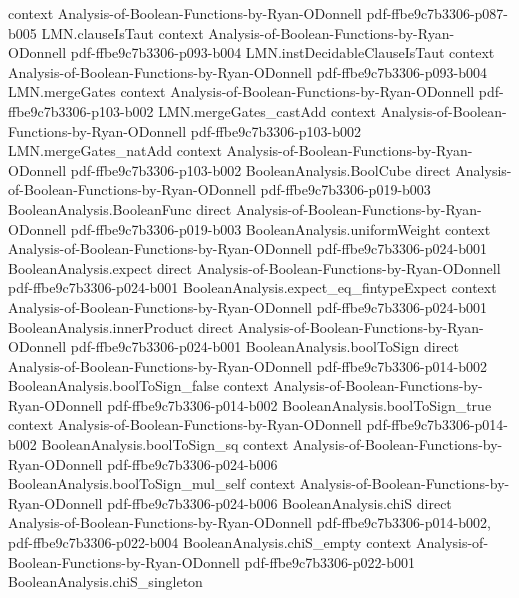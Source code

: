 \begin{theorem}
  {context}
  {Analysis-of-Boolean-Functions-by-Ryan-ODonnell}
  {pdf-ffbe9c7b3306-p087-b005}
\proofstep
  {LMN.clauseIsTaut}
  {context}
  {Analysis-of-Boolean-Functions-by-Ryan-ODonnell}
  {pdf-ffbe9c7b3306-p093-b004}
\proofstep
  {LMN.instDecidableClauseIsTaut}
  {context}
  {Analysis-of-Boolean-Functions-by-Ryan-ODonnell}
  {pdf-ffbe9c7b3306-p093-b004}
\proofstep
  {LMN.mergeGates}
  {context}
  {Analysis-of-Boolean-Functions-by-Ryan-ODonnell}
  {pdf-ffbe9c7b3306-p103-b002}
\proofstep
  {LMN.mergeGates_castAdd}
  {context}
  {Analysis-of-Boolean-Functions-by-Ryan-ODonnell}
  {pdf-ffbe9c7b3306-p103-b002}
\proofstep
  {LMN.mergeGates_natAdd}
  {context}
  {Analysis-of-Boolean-Functions-by-Ryan-ODonnell}
  {pdf-ffbe9c7b3306-p103-b002}
\proofstep
  {BooleanAnalysis.BoolCube}
  {direct}
  {Analysis-of-Boolean-Functions-by-Ryan-ODonnell}
  {pdf-ffbe9c7b3306-p019-b003}
\proofstep
  {BooleanAnalysis.BooleanFunc}
  {direct}
  {Analysis-of-Boolean-Functions-by-Ryan-ODonnell}
  {pdf-ffbe9c7b3306-p019-b003}
\proofstep
  {BooleanAnalysis.uniformWeight}
  {context}
  {Analysis-of-Boolean-Functions-by-Ryan-ODonnell}
  {pdf-ffbe9c7b3306-p024-b001}
\proofstep
  {BooleanAnalysis.expect}
  {direct}
  {Analysis-of-Boolean-Functions-by-Ryan-ODonnell}
  {pdf-ffbe9c7b3306-p024-b001}
\proofstep
  {BooleanAnalysis.expect_eq_fintypeExpect}
  {context}
  {Analysis-of-Boolean-Functions-by-Ryan-ODonnell}
  {pdf-ffbe9c7b3306-p024-b001}
\proofstep
  {BooleanAnalysis.innerProduct}
  {direct}
  {Analysis-of-Boolean-Functions-by-Ryan-ODonnell}
  {pdf-ffbe9c7b3306-p024-b001}
\proofstep
  {BooleanAnalysis.boolToSign}
  {direct}
  {Analysis-of-Boolean-Functions-by-Ryan-ODonnell}
  {pdf-ffbe9c7b3306-p014-b002}
\proofstep
  {BooleanAnalysis.boolToSign_false}
  {context}
  {Analysis-of-Boolean-Functions-by-Ryan-ODonnell}
  {pdf-ffbe9c7b3306-p014-b002}
\proofstep
  {BooleanAnalysis.boolToSign_true}
  {context}
  {Analysis-of-Boolean-Functions-by-Ryan-ODonnell}
  {pdf-ffbe9c7b3306-p014-b002}
\proofstep
  {BooleanAnalysis.boolToSign_sq}
  {context}
  {Analysis-of-Boolean-Functions-by-Ryan-ODonnell}
  {pdf-ffbe9c7b3306-p024-b006}
\proofstep
  {BooleanAnalysis.boolToSign_mul_self}
  {context}
  {Analysis-of-Boolean-Functions-by-Ryan-ODonnell}
  {pdf-ffbe9c7b3306-p024-b006}
\proofstep
  {BooleanAnalysis.chiS}
  {direct}
  {Analysis-of-Boolean-Functions-by-Ryan-ODonnell}
  {pdf-ffbe9c7b3306-p014-b002,
    pdf-ffbe9c7b3306-p022-b004}
\proofstep
  {BooleanAnalysis.chiS_empty}
  {context}
  {Analysis-of-Boolean-Functions-by-Ryan-ODonnell}
  {pdf-ffbe9c7b3306-p022-b001}
\proofstep
  {BooleanAnalysis.chiS_singleton}

\end{theorem}
